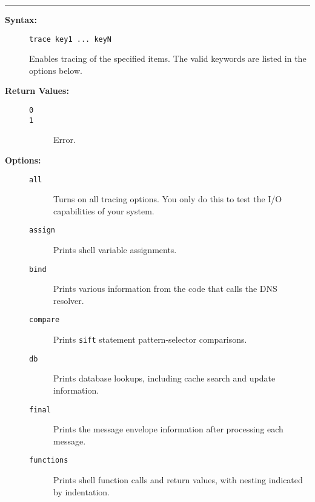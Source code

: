 \hrule
\begin{description}
\item[{\bf Syntax:}] \mbox{}

{\tt trace key1 ... keyN}

Enables tracing of the specified items. The valid keywords 
are listed in the options below. 

\item[{\bf Return Values:}] \mbox{}

\begin{description}
\item[{\tt 0}] \mbox{}



\item[{\tt 1}] \mbox{}

Error.

\end{description}


\item[{\bf Options:}] \mbox{}

\begin{description}
\item[{\tt all}] \mbox{}

Turns on all tracing options. You only 
do this to test the I/O capabilities of your system. 

\item[{\tt assign}] \mbox{}

Prints shell variable assignments. 

\item[{\tt bind}] \mbox{}

Prints various information from the 
code that calls the DNS resolver. 

\item[{\tt compare}] \mbox{}

Prints {\tt sift} statement 
pattern-selector comparisons. 

\item[{\tt db}] \mbox{}

Prints database lookups, including cache 
search and update information. 

\item[{\tt final}] \mbox{}

Prints the message envelope information 
after processing each message. 

\item[{\tt functions}] \mbox{}

Prints shell function calls and 
return values, with nesting indicated by indentation. 


\end{description}
\end{description}

